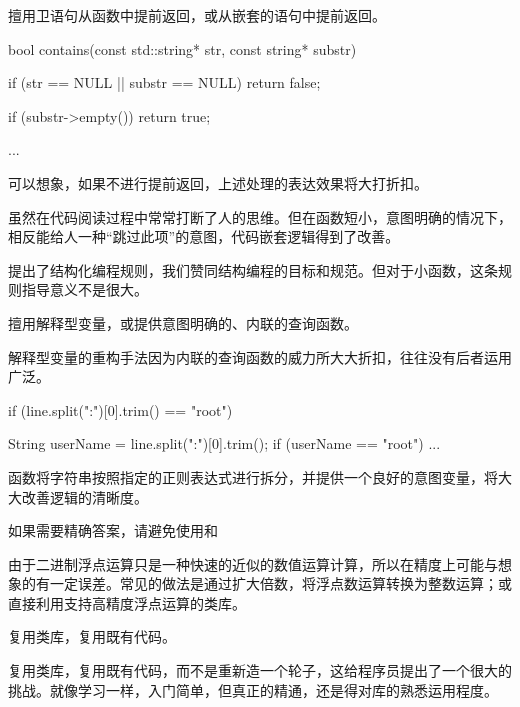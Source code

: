 \begin{content}
\begin{regulation}
擅用卫语句从函数中提前返回，或从嵌套的语句中提前返回。
\end{regulation}

\begin{leftbar}
\begin{c++}
bool contains(const std::string* str, const string* substr) 
{
    if (str == NULL || substr == NULL)
        return false;
    
    if (substr->empty()) 
        return true;

    ...
}
\end{c++}
\end{leftbar}

可以想象，如果不进行提前返回，上述处理的表达效果将大打折扣。

虽然在代码阅读过程中常常打断了人的思维。但在函数短小，意图明确的情况下，相反能给人一种“跳过此项”的意图，代码嵌套逻辑得到了改善。

提出了结构化编程规则，我们赞同结构编程的目标和规范。但对于小函数，这条规则指导意义不是很大。

\begin{regulation}
擅用解释型变量，或提供意图明确的、内联的查询函数。
\end{regulation}

解释型变量的重构手法因为内联的查询函数的威力所大大折扣，往往没有后者运用广泛。

\begin{leftbar}
\begin{c++}
if (line.split(":")[0].trim() == "root")
\end{c++}
\end{leftbar}

\begin{leftbar}
\begin{c++}
String userName = line.split(":")[0].trim();
if (userName == "root")
{
    ...
}
\end{c++}
\end{leftbar}

函数将字符串按照指定的正则表达式进行拆分，并提供一个良好的意图变量，将大大改善逻辑的清晰度。

\begin{regulation}
如果需要精确答案，请避免使用和
\end{regulation}

由于二进制浮点运算只是一种快速的近似的数值运算计算，所以在精度上可能与想象的有一定误差。常见的做法是通过扩大倍数，将浮点数运算转换为整数运算；或直接利用支持高精度浮点运算的类库。

\begin{regulation}
复用类库，复用既有代码。
\end{regulation}

复用类库，复用既有代码，而不是重新造一个轮子，这给程序员提出了一个很大的挑战。就像学习一样，入门简单，但真正的精通，还是得对库的熟悉运用程度。

\end{content}
